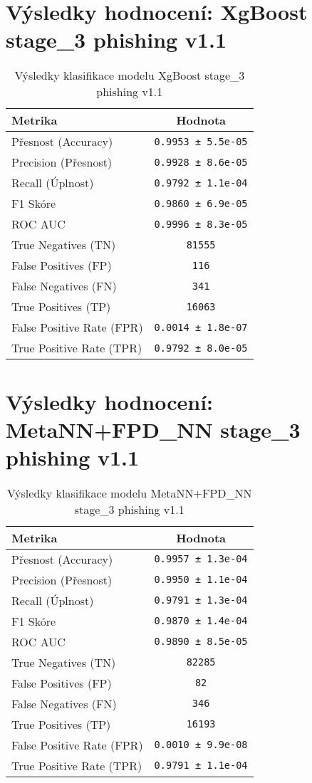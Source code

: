 \section*{Výsledky hodnocení: XgBoost stage_3 phishing v1.1}
\begin{table}[h!]
\centering
\begin{tabular}{|l|c|}
\hline
\textbf{Metrika} & \textbf{Hodnota} \\
\hline
Přesnost (Accuracy) & \texttt{0.9953 ± 5.5e-05} \\
Precision (Přesnost) & \texttt{0.9928 ± 8.6e-05} \\
Recall (Úplnost) & \texttt{0.9792 ± 1.1e-04} \\
F1 Skóre & \texttt{0.9860 ± 6.9e-05} \\
ROC AUC & \texttt{0.9996 ± 8.3e-05} \\
True Negatives (TN) & \texttt{81555} \\
False Positives (FP) & \texttt{116} \\
False Negatives (FN) & \texttt{341} \\
True Positives (TP) & \texttt{16063} \\
False Positive Rate (FPR) & \texttt{0.0014 ± 1.8e-07} \\
True Positive Rate (TPR) & \texttt{0.9792 ± 8.0e-05} \\
\hline
\end{tabular}
\caption{Výsledky klasifikace modelu XgBoost stage_3 phishing v1.1}
\label{tab:phishing_xgboost}
\end{table}

\section*{Výsledky hodnocení: MetaNN+FPD_NN stage_3 phishing v1.1}
\begin{table}[h!]
\centering
\begin{tabular}{|l|c|}
\hline
\textbf{Metrika} & \textbf{Hodnota} \\
\hline
Přesnost (Accuracy) & \texttt{0.9957 ± 1.3e-04} \\
Precision (Přesnost) & \texttt{0.9950 ± 1.1e-04} \\
Recall (Úplnost) & \texttt{0.9791 ± 1.3e-04} \\
F1 Skóre & \texttt{0.9870 ± 1.4e-04} \\
ROC AUC & \texttt{0.9890 ± 8.5e-05} \\
True Negatives (TN) & \texttt{82285} \\
False Positives (FP) & \texttt{82} \\
False Negatives (FN) & \texttt{346} \\
True Positives (TP) & \texttt{16193} \\
False Positive Rate (FPR) & \texttt{0.0010 ± 9.9e-08} \\
True Positive Rate (TPR) & \texttt{0.9791 ± 1.1e-04} \\
\hline
\end{tabular}
\caption{Výsledky klasifikace modelu MetaNN+FPD_NN stage_3 phishing v1.1}
\label{tab:phishing_metann+fpd_nn}
\end{table}

